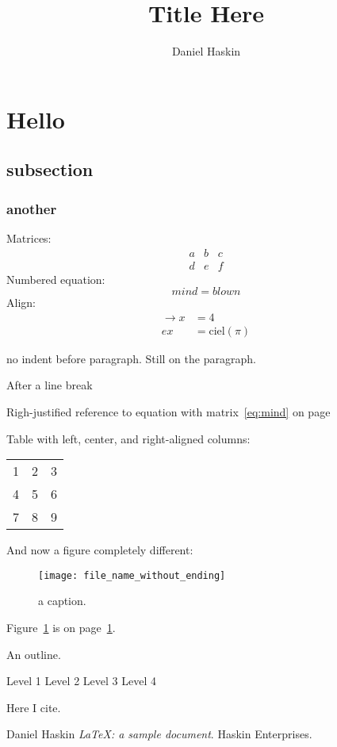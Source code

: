 \documentclass[12pt]{article}
\title{Title Here}
\author{Daniel Haskin}
\begin{document}
\maketitle
\section{Hello}
\subsection{subsection}
\subsubsection{another}

Matrices:
\begin{equation*}
    \begin{matrix}
        a & b & c \\
        d & e & f
    \end{matrix}
\end{equation*}
Numbered equation:
\begin{equation}
    mind = blown
    \label{eq:mind}
\end{equation}
Align:
\begin{align*}
    \to x &= 4 \\
    e x &= \text{ciel}(\pi)
\end{align*}

\noindent no indent before paragraph.
Still on the paragraph.

After a line break

\begin{flushright}
    Righ-justified reference to equation with matrix~\ref{eq:mind} on page~\pageref{eq:mind}
\end{flushright}

Table with left, center, and right-aligned columns:
\begin{tabular}{ l | c || r }
    \hline
    1 & 2 & 3 \\
    4 & 5 & 6 \\
    7 & 8 & 9 \\
    \hline
\end{tabular}

And now a figure completely different:
\begin{figure}[h!]
    \begin{center}
        \texttt{[image: file\_name\_without\_ending]}
    \end{center}
  \caption{a caption.}
  \label{fig:g}
\end{figure}
Figure~\ref{fig:g} is on page~\ref{fig:g}.

An outline.
\begin{outline}[enumerate]
    \1 Level 1
        \2 Level 2
            \3 Level 3
                \4 Level 4
\end{outline}

Here I cite\cite{hoo}.
\begin{thebibliography}{9}

        Daniel Haskin
        \emph{\LaTeX: a sample document}.
        Haskin Enterprises.


\end{thebibliography}
\end{document}
